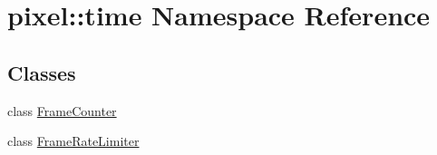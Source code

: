 \hypertarget{namespacepixel_1_1time}{}\section{pixel\+:\+:time Namespace Reference}
\label{namespacepixel_1_1time}
\subsection*{Classes}
\begin{DoxyCompactItemize}
\item 
class \hyperlink{classpixel_1_1time_1_1_frame_counter}{Frame\+Counter}
\item 
class \hyperlink{classpixel_1_1time_1_1_frame_rate_limiter}{Frame\+Rate\+Limiter}
\end{DoxyCompactItemize}
